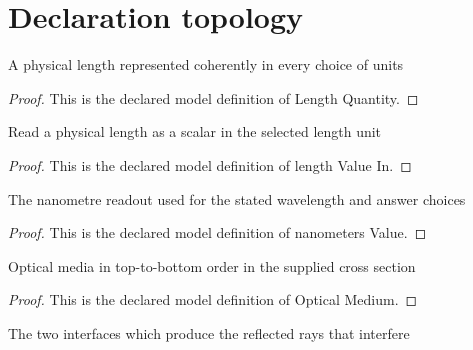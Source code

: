 \section{Declaration topology}
\begin{definition}
  \label{def:physics:phyx-mini-0151:phyxminiproblems-problemphyxmini0151-lengthquantity}
  A physical length represented coherently in every choice of units
\end{definition}
\begin{proof}
  This is the declared model definition of Length Quantity.
\end{proof}
\begin{definition}
  \label{def:physics:phyx-mini-0151:phyxminiproblems-problemphyxmini0151-lengthvaluein}
  Read a physical length as a scalar in the selected length unit
\end{definition}
\begin{proof}
  This is the declared model definition of length Value In.
\end{proof}
\begin{definition}
  \label{def:physics:phyx-mini-0151:phyxminiproblems-problemphyxmini0151-nanometersvalue}
  The nanometre readout used for the stated wavelength and answer choices
\end{definition}
\begin{proof}
  This is the declared model definition of nanometers Value.
\end{proof}
\begin{definition}
  \label{def:physics:phyx-mini-0151:phyxminiproblems-problemphyxmini0151-opticalmedium}
  Optical media in top-to-bottom order in the supplied cross section
\end{definition}
\begin{proof}
  This is the declared model definition of Optical Medium.
\end{proof}
\begin{definition}
  \label{def:physics:phyx-mini-0151:phyxminiproblems-problemphyxmini0151-filminterface}
  The two interfaces which produce the reflected rays that interfere
\end{definition}

